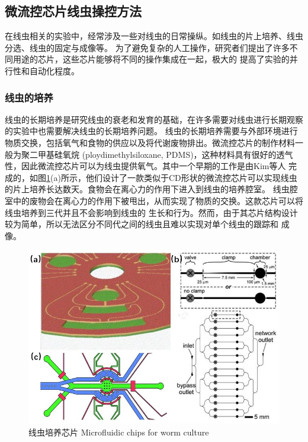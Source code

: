\subsection{微流控芯片线虫操控方法}
	在线虫相关的实验中，经常涉及一些对线虫的日常操纵。如线虫的片上培养、线虫分选、线虫的固定与成像等。
	为了避免复杂的人工操作，研究者们提出了许多不同用途的芯片，这些芯片能够将不同的操作集成在一起，极大的
	提高了实验的并行性和自动化程度。
	
\subsubsection{线虫的培养}
\label{sec:intro:analog}
	线虫的长期培养是研究线虫的衰老和发育的基础，在许多需要对线虫进行长期观察的实验中也需要解决线虫的长期培养问题。
	线虫的长期培养需要与外部环境进行物质交换，包括氧气和食物的供应以及将代谢废物排出。微流控芯片的制作材料一般为聚二甲基硅氧烷
	(ploydimethylsiloxane, PDMS)，这种材料具有很好的透气性，因此微流控芯片可以为线虫提供氧气。其中一个早期的工作是由Kim等人\cite{Kim2007Automated}
	完成的，如图\ref{fig:cd}(a)所示，他们设计了一款类似于CD形状的微流控芯片可以实现线虫的片上培养长达数天。食物会在离心力的作用下进入到线虫的培养腔室。
	线虫腔室中的废物会在离心力的作用下被甩出，从而实现了物质的交换。这款芯片可以将线虫培养到三代并且不会影响到线虫的
	生长和行为。然而，由于其芯片结构设计较为简单，所以无法区分不同代之间的线虫且难以实现对单个线虫的跟踪和
	成像。
	\begin{figure}[h]
	  \centering
	  \includegraphics[width=12cm]{figure/chap1/wormculture.jpg}
	  \bicaption
		{线虫培养芯片}
		{Microfluidic chips for worm culture}
	  \label{fig:cd}
	\end{figure}
	
